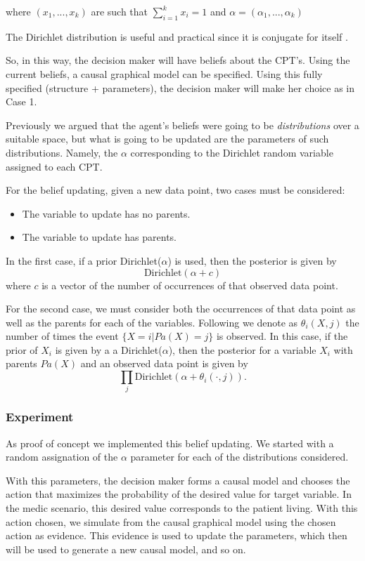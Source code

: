 \documentclass{article}
\begin{document}
where $(x_1,...,x_k)$ are such that $\sum_{i=1}^k x_i =1$ and $\alpha=(\alpha_1,...,\alpha_k)$

The Dirichlet distribution is useful and practical since it is conjugate for itself \cite{bernardo2000bayesian}.

So, in this way, the decision maker will have beliefs about the CPT's. Using the current beliefs, a causal graphical model can be specified. Using this fully specified (structure + parameters), the decision maker will make her choice as in Case 1.

Previously we argued that the agent's beliefs were going to be \textit{distributions} over a suitable space, but what is going to be updated are the parameters of such distributions. Namely, the $\alpha$ corresponding to the Dirichlet random variable assigned to each CPT.

For the belief updating, given a new data point,  two cases must be considered:
\begin{itemize}
\item The variable to update has no parents.
\item The variable to update has parents.
\end{itemize}

In the first case, if a prior Dirichlet($\alpha$) is used, then the posterior is given by
\[ \textrm{Dirichlet}(\alpha + c) \]
where $c$ is a vector of the number of occurrences of that observed data point. 

For the second case, we must consider both the occurrences of that data point as well as the parents for each of the variables. Following \cite{barber2012bayesian} we denote as $\theta_i(X,j)$ the number of times the event $\{X=i | Pa(X)=j\}$ is observed. In this case, if the prior of $X_i$ is given by a a Dirichlet($\alpha$), then the posterior for a variable $X_i$ with parents $Pa(X)$ and an observed data point is given by 
\[ \prod_j \textrm{Dirichlet}(\alpha + \theta_i(\cdot,j)). \]


\subsubsection{Experiment}
As proof of concept we implemented this belief updating. We started with a random assignation of the $\alpha$ parameter for each of the distributions considered. 

With this parameters, the decision maker forms a causal model and chooses the action that maximizes the probability of the desired value for target variable. In the medic scenario, this desired value corresponds to the patient living. With this action chosen, we simulate from the causal graphical model using the chosen action as evidence. This evidence is used to update the parameters, which then will be used to generate a new causal model, and so on.
\end{document}
